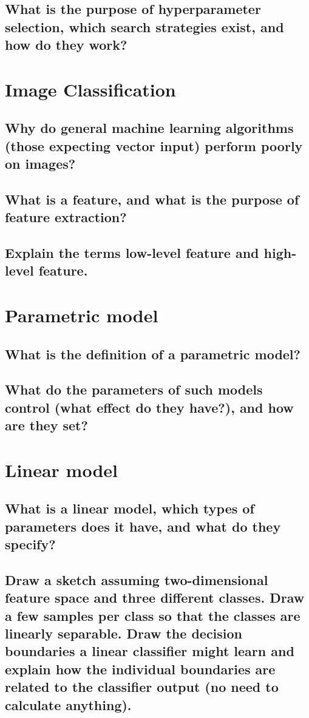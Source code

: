 \subsection{What is the purpose of hyperparameter selection, which search strategies exist, and how do they work?}



\section{Image Classification}
\subsection{Why do general machine learning algorithms (those expecting vector input) perform poorly on images?}
\subsection{What is a feature, and what is the purpose of feature extraction?}
\subsection{Explain the terms low-level feature and high-level feature.}

\section{Parametric model}
\subsection{What is the definition of a parametric model?}
\subsection{What do the parameters of such models control (what effect do they have?), and how are they set?}

\section{Linear model}
\subsection{What is a linear model, which types of parameters does it have, and what do they specify?}
\subsection{Draw a sketch assuming two-dimensional feature space and three different classes. Draw a few samples per class so that the classes are linearly separable. Draw the decision boundaries a linear classifier might learn and explain how the individual boundaries are related to the classifier output (no need to calculate anything).}

